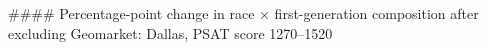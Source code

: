 #### Percentage-point change in race × first-generation composition after excluding Geomarket: Dallas, PSAT score 1270–1520
